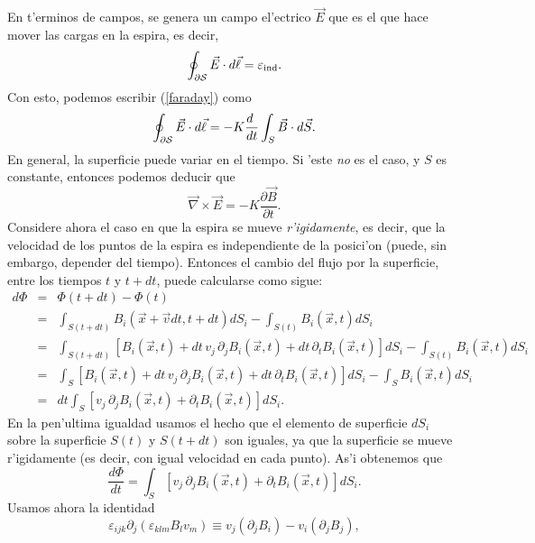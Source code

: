 En t'erminos de campos, se genera un campo el'ectrico $\vec{E}$ que es el que
hace mover las cargas en la espira, es decir,
\begin{equation}
\oint_{\cal\partial S}\vec{E}\cdot d\vec{\ell}=\varepsilon_{\rm ind}.
\end{equation}
Con esto, podemos escribir (\ref{faraday}) como
\begin{equation}
\oint_{\cal \partial S}\vec{E}\cdot d\vec{\ell}=-K\frac{d\ }{dt}\int_S\vec{B}\cdot
d\vec{S}.
\end{equation}
En general, la superficie puede variar en el tiempo. Si 'este \textit{no} es el caso, y $S$
es constante, entonces podemos deducir que
\begin{equation}\label{ley-faraday0}
\vec\nabla\times\vec{E}=-K\frac{\partial\vec{B}}{\partial t}.
\end{equation}
Considere ahora el caso en que la espira se mueve \textit{r'igidamente}, es decir, que la velocidad de los puntos de la espira es independiente de la posici'on (puede, sin embargo, depender del tiempo).
Entonces el cambio del flujo por la superficie, entre los tiempos $t$ y $t+dt$, puede calcularse como sigue:
\begin{eqnarray}
 d\Phi &=& \Phi(t+dt)-\Phi(t)\\
&=&
\int_{S(t+dt)}B_i(\vec{x}+\vec{v}dt,t+dt)dS_i-\int_{S(t)}B_i(\vec{x},t)dS_i\\
&=&\int_{S(t+dt)}\left[B_i(\vec{x},t)+dt\,v_j\,\partial_jB_i(\vec{x},
t)+dt\,\partial_tB_i(\vec{x},t)\right ] dS_i-\int_{S(t)}B_i(\vec{x},t)dS_i\\
&=&\int_S\left[B_i(\vec{x},t)+dt\,v_j\,\partial_jB_i(\vec{x},
t)+dt\,\partial_tB_i(\vec{x},t)\right ] dS_i-\int_SB_i(\vec{x},t)dS_i\\
&=&dt\int_S\left[v_j\,\partial_jB_i(\vec{x},t)+\partial_tB_i(\vec{x},t)\right
] dS_i.
\end{eqnarray}
En la pen'ultima igualdad usamos el hecho que el elemento de superficie $dS_i$ sobre la superficie $S(t)$ y $S(t+dt)$ son iguales, ya que la superficie se mueve r'igidamente (es decir, con igual velocidad en cada punto). As'i obtenemos que
\begin{equation}\label{dPhidt0}
 \frac{d\Phi}{dt}=\int_S\left[v_j\,\partial_jB_i(\vec{x},t)+\partial_tB_i(\vec
{x},t)\right] dS_i.
\end{equation}
Usamos ahora la identidad
\begin{equation}
\varepsilon_{ijk}\partial_j(\varepsilon_{klm}B_lv_m)\equiv
v_j(\partial_jB_i)-v_i(\partial_jB_j),
\end{equation}
